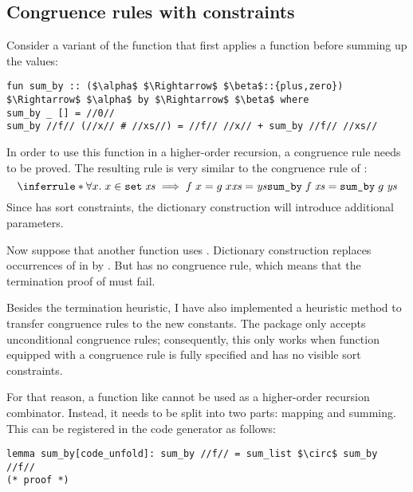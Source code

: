 \subsection{Congruence rules with constraints}

Consider a variant of the  function that first applies a function before summing up the values:
%
\begin{lstlisting}
fun sum_by :: ($\alpha$ $\Rightarrow$ $\beta$::{plus,zero}) $\Rightarrow$ $\alpha$ by $\Rightarrow$ $\beta$ where
sum_by _ [] = //0//
sum_by //f// (//x// # //xs//) = //f// //x// + sum_by //f// //xs//
\end{lstlisting}
%
In order to use this function in a higher-order recursion, a congruence rule needs to be proved.
The resulting rule is very similar to the congruence rule of :
\[
  \inferrule*{
    \forall x.\; x \in \holconst{set}\;\mathit{xs} \implies f\;x = g\;x\\
    \mathit{xs} = \mathit{ys}
  }{\holconst{sum\_by}\;f\;\mathit{xs} = \holconst{sum\_by}\;g\;\mathit{ys}}
\]
%
Since  has sort constraints, the dictionary construction will introduce additional parameters.

Now suppose that another function  uses .
Dictionary construction replaces occurrences of  in  by .
But  has no congruence rule, which means that the termination proof of  must fail.

Besides the termination heuristic, I have also implemented a heuristic method to transfer congruence rules to the new constants.
The  package only accepts unconditional congruence rules; consequently, this only works when function equipped with a congruence rule is fully specified and has no visible sort constraints.

For that reason, a function like  cannot be used as a higher-order recursion combinator.
Instead, it needs to be split into two parts: mapping and summing.
This can be registered in the code generator as follows:
%
\begin{lstlisting}
lemma sum_by[code_unfold]: sum_by //f// = sum_list $\circ$ sum_by //f//
(* proof *)
\end{lstlisting}

